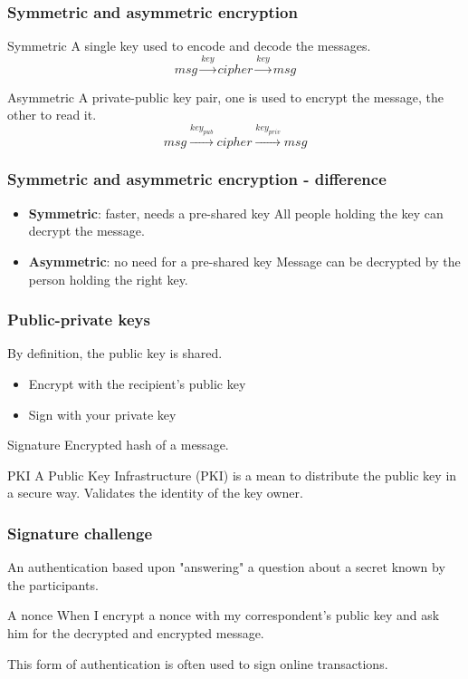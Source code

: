 \begin{frame}
\frametitle{Symmetric and asymmetric encryption}
\begin{block}{Symmetric}
A single key used to encode and decode the messages.
\[ msg \xrightarrow{key} cipher \xrightarrow{key} msg \]
\end{block}
\begin{block}{Asymmetric}
A private-public key pair, one is used to encrypt the message, the other to
read it.
\[ msg \xrightarrow{key_{pub}} cipher \xrightarrow{key_{priv}} msg \]
\end{block}
\end{frame}

\begin{frame}
\frametitle{Symmetric and asymmetric encryption - difference}
\begin{itemize}
\item \textbf{Symmetric}: faster, needs a pre-shared key
	\newline All people holding the key can decrypt the message.
\item \textbf{Asymmetric}: no need for a pre-shared key
	\newline Message can be decrypted by the person holding the right key.
\end{itemize}
\end{frame}

\begin{frame}
\frametitle{Public-private keys}
By definition, the public key is shared.
\begin{itemize}
\item Encrypt with the recipient's public key
\item Sign with your private key
\end{itemize}
\begin{exampleblock}{Signature}
Encrypted hash of a message.
\end{exampleblock}
\begin{block}{PKI}
A Public Key Infrastructure (PKI) is a mean to distribute the public key in a
secure way.
Validates the identity of the key owner.
\end{block}
\end{frame}

\begin{frame}
\frametitle{Signature challenge}
An authentication based upon "answering" a question about a secret
known by the participants.
\begin{exampleblock}{A nonce}
When I encrypt a nonce with my correspondent's public key and ask him for the
decrypted and encrypted message.
\end{exampleblock}
This form of authentication is often used to sign online transactions.
\end{frame}


